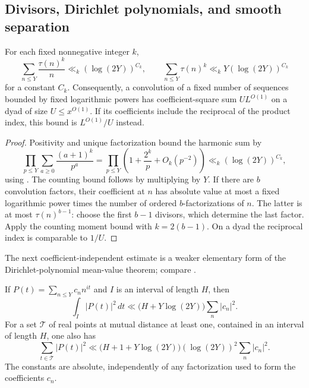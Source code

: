\subsection{Divisors, Dirichlet polynomials, and smooth separation}

\begin{lemma}\label{lem:divisor-moments}
For each fixed nonnegative integer $k$,
\[
 \sum_{n\le Y}\frac{\tau(n)^k}{n}\ll_k(\log(2Y))^{C_k},
 \qquad
 \sum_{n\le Y}\tau(n)^k\ll_k Y(\log(2Y))^{C_k}
\]
for a constant $C_k$. Consequently, a convolution of a fixed number
of sequences bounded by fixed logarithmic powers has coefficient-square
sum $U L^{O(1)}$ on a dyad of size $U\le x^{O(1)}$.
If its coefficients include the reciprocal of the product index, this
bound is $L^{O(1)}/U$ instead.
\end{lemma}

\begin{proof}
Positivity and unique factorization bound the harmonic sum by
\[
 \prod_{p\le Y}\sum_{a\ge0}\frac{(a+1)^k}{p^a}
 =\prod_{p\le Y}\left(1+\frac{2^k}{p}+O_k(p^{-2})\right)
 \ll_k (\log(2Y))^{C_k},
\]
using . The counting bound follows by multiplying by
$Y$. If there are $b$ convolution factors, their coefficient at $n$
has absolute value at most a fixed logarithmic power times the number
of ordered $b$-factorizations of $n$. The latter is at most
$\tau(n)^{b-1}$: choose the first $b-1$ divisors, which determine the
last factor. Apply the counting moment bound with $k=2(b-1)$.
On a dyad the reciprocal index is comparable to $1/U$.
\end{proof}

The next coefficient-independent estimate is a weaker elementary form
of the Dirichlet-polynomial mean-value theorem; compare
\cite[Theorem~2 and Corollary~3]{MontgomeryVaughan1974}.

\begin{lemma}\label{lem:dirichlet-mean}
If $P(t)=\sum_{n\le Y}c_n n^{it}$ and $I$ is an interval of length $H$,
then
\[
 \int_I|P(t)|^2\,dt
 \ll \bigl(H+Y\log(2Y)\bigr)\sum_n|c_n|^2.
\]
For a set $\mathcal T$ of real points at mutual distance at least one,
contained in an interval of length $H$, one also has
\begin{equation}\label{eq:discrete-mean}
 \sum_{t\in\mathcal T}|P(t)|^2
 \ll \bigl(H+1+Y\log(2Y)\bigr)(\log(2Y))^2
       \sum_n|c_n|^2.
\end{equation}
The constants are absolute, independently of any factorization used
to form the coefficients $c_n$.
\end{lemma}

